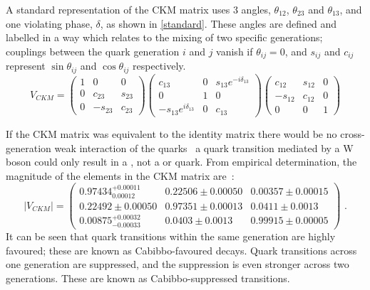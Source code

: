 A standard representation of the CKM matrix uses 3 angles, $\theta_{12}$, $\theta_{23}$ and $\theta_{13}$, and one \CP violating phase, $\delta$, as shown in \eqn\ref{standard}. These angles are defined and labelled in a way which relates to the mixing of two specific generations; couplings between the quark generation $i$ and $j$ vanish if $\theta_{ij} = 0$, and $s_{ij}$ and $c_{ij}$ represent $\sin\theta_{ij}$ and $\cos\theta_{ij}$ respectively.
\begin{equation}
V_{CKM} = \begin{pmatrix} 1 & 0 & 0 \\ 
0 & c_{23} & s_{23} \\ 
0 & -s_{23} & c_{23} \end{pmatrix}
\begin{pmatrix} c_{13} & 0 & s_{13}e^{-i\delta_{13}} \\ 
0 & 1 & 0 \\ 
-s_{13}e^{i\delta_{13}} & 0 & c_{13} \end{pmatrix}
\begin{pmatrix} c_{12} & s_{12} & 0 \\ 
-s_{12} & c_{12} & 0 \\ 
0 & 0 & 1 \end{pmatrix}
\label{standard}
\end{equation}

If the CKM matrix was equivalent to the identity matrix there would be no cross-generation weak interaction of the quarks \eg\ a \uquark quark transition mediated by a W boson could only result in a \dquark, not a \squark or \bquark quark. From empirical determination, the magnitude of the elements in the CKM matrix are~\cite{PDG2016}:
\begin{equation}
| V_{CKM} | = \begin{pmatrix} 0.97434^{+0.00011}_{0.00012} & 0.22506 \pm 0.00050 & 0.00357 \pm 0.00015 \\ 0.22492 \pm 0.00050 & 0.97351 \pm 0.00013 & 0.0411 \pm 0.0013 \\ 0.00875^{+0.00032}_{-0.00033} & 0.0403 \pm 0.0013 & 0.99915 \pm 0.00005 \end{pmatrix} \text{ .}
\end{equation}
It can be seen that quark transitions within the same generation are highly favoured; these are known as Cabibbo-favoured decays. Quark transitions across one generation are suppressed, and the suppression is even stronger across two generations. These are known as Cabibbo-suppressed transitions. 

